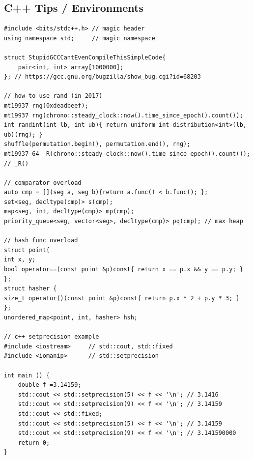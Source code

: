 \documentclass[landscape, 8pt, a4paper, oneside, twocolumn]{extarticle}
\begin{document}
\subsection {C++ Tips / Environments}
\begin{verbatim}
#include <bits/stdc++.h> // magic header
using namespace std;     // magic namespace

struct StupidGCCCantEvenCompileThisSimpleCode{
    pair<int, int> array[1000000];
}; // https://gcc.gnu.org/bugzilla/show_bug.cgi?id=68203

// how to use rand (in 2017)
mt19937 rng(0xdeadbeef);
mt19937 rng(chrono::steady_clock::now().time_since_epoch().count());
int randint(int lb, int ub){ return uniform_int_distribution<int>(lb, ub)(rng); }
shuffle(permutation.begin(), permutation.end(), rng);
mt19937_64 _R(chrono::steady_clock::now().time_since_epoch().count()); // _R()

// comparator overload
auto cmp = [](seg a, seg b){return a.func() < b.func(); };
set<seg, decltype(cmp)> s(cmp); 
map<seg, int, decltype(cmp)> mp(cmp);
priority_queue<seg, vector<seg>, decltype(cmp)> pq(cmp); // max heap

// hash func overload
struct point{
int x, y;
bool operator==(const point &p)const{ return x == p.x && y == p.y; }
};
struct hasher {
size_t operator()(const point &p)const{ return p.x * 2 + p.y * 3; }
};
unordered_map<point, int, hasher> hsh;

// c++ setprecision example
#include <iostream>     // std::cout, std::fixed
#include <iomanip>      // std::setprecision

int main () {
    double f =3.14159;
    std::cout << std::setprecision(5) << f << '\n'; // 3.1416
    std::cout << std::setprecision(9) << f << '\n'; // 3.14159
    std::cout << std::fixed;
    std::cout << std::setprecision(5) << f << '\n'; // 3.14159
    std::cout << std::setprecision(9) << f << '\n'; // 3.141590000
    return 0;
}
\end{verbatim}

\end{document}
